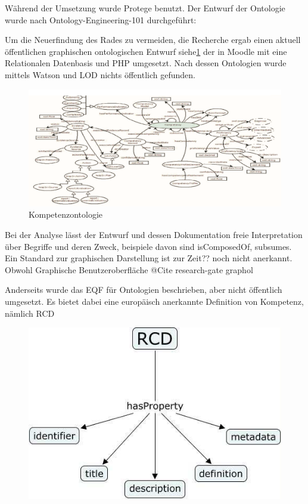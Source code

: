 \documentclass[
12pt,
english,
ngerman,
headsepline,
twoside,
openright,
numbers=noenddot,version=first
]{scrreprt}
\begin{document}
Während der Umsetzung wurde Protege\cite{Protégé} benutzt.
Der Entwurf der Ontologie wurde nach Ontology-Engineering-101 durchgeführt:


Um die Neuerfindung des Rades zu vermeiden, die Recherche ergab einen aktuell öffentlichen graphischen ontologischen Entwurf\cite{ontoMoodle} siehe\ref{fig:competence-ontology} der in Moodle mit eine Relationalen Datenbasis und PHP umgesetzt. Nach dessen Ontologien wurde mittels Watson\cite{Watson} und LOD\cite{LOD} nichts öffentlich gefunden. 


\begin{figure}[h]
	\centering
	\includegraphics[angle=90]{pics/competency-ontology.png}
	\caption{Kompetenzontologie}
	\label{fig:competence-ontology}
\end{figure}

Bei der Analyse lässt der Entwurf und dessen Dokumentation freie Interpretation über Begriffe und deren Zweck, beispiele davon sind \glqq isComposedOf\grqq, \glqq subsumes\grqq. Ein Standard zur graphischen Darstellung ist zur Zeit?? noch nicht anerkannt. Obwohl Graphische Benutzeroberfläche  @Cite research-gate graphol

Anderseits wurde das \acrshort{EQF} für Ontologien beschrieben, aber nicht öffentlich umgesetzt. Es bietet dabei eine europäisch anerkannte Definition von Kompetenz, nämlich RCD\cite{eqfCompetency}


\begin{figure}
	\includegraphics[width=0.9\linewidth]{pics/RCD.jpg}
\end{figure}
\end{document}
